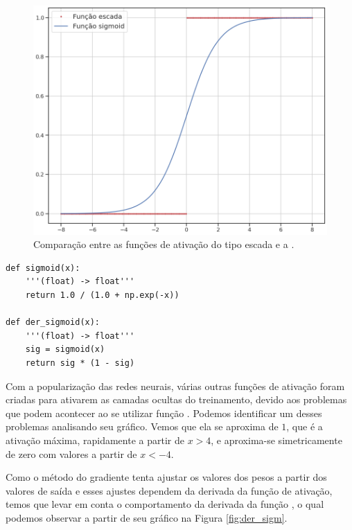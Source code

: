 \begin{figure}[htb]
\centering
\includegraphics[width=12cm]{figuras/ativacao}
\caption{Comparação entre as funções de ativação do tipo escada e a .}
\label{fig:ativacao}
\end{figure}


\estiloR
\begin{lstlisting}[caption={Trecho do script util.py}, label={lst:ativacao}, escapeinside={\%}]
def sigmoid(x):
    '''(float) -> float'''
    return 1.0 / (1.0 + np.exp(-x))

def der_sigmoid(x):
    '''(float) -> float'''
    sig = sigmoid(x)
    return sig * (1 - sig)
\end{lstlisting}


Com a popularização das redes neurais, várias outras funções de ativação foram criadas para ativarem as camadas ocultas do treinamento, devido aos problemas que podem acontecer ao se utilizar função . Podemos identificar um desses problemas analisando seu gráfico. Vemos que ela se aproxima de $1$, que é a ativação máxima, rapidamente a partir de $x > 4$, e aproxima-se simetricamente de zero com valores a partir de $x < -4$. 

Como o método do gradiente tenta ajustar os valores dos pesos a partir dos valores de saída e esses ajustes dependem da derivada da função de ativação, temos que levar em conta o comportamento da derivada da função , o qual podemos observar a partir de seu gráfico na Figura \ref{fig:der_sigm}.

